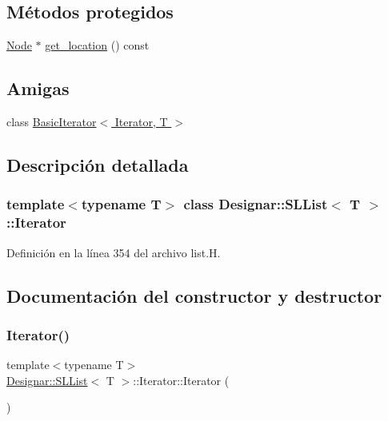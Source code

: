 \subsection*{Métodos protegidos}
\begin{DoxyCompactItemize}
\item 
\hyperlink{class_designar_1_1_node_s_l_list_a41963019ada1025099e3259207a3de96}{Node} $\ast$ \hyperlink{class_designar_1_1_s_l_list_1_1_iterator_af994c3d4b1f178e55d8b68d3b7a515cf}{get\+\_\+location} () const
\end{DoxyCompactItemize}
\subsection*{Amigas}
\begin{DoxyCompactItemize}
\item 
class \hyperlink{class_designar_1_1_s_l_list_1_1_iterator_ae3421d6be56b523bf3c41ceb29f3e5d7}{Basic\+Iterator$<$ Iterator, T $>$}
\end{DoxyCompactItemize}


\subsection{Descripción detallada}
\subsubsection*{template$<$typename T$>$\newline
class Designar\+::\+S\+L\+List$<$ T $>$\+::\+Iterator}



Definición en la línea 354 del archivo list.\+H.



\subsection{Documentación del constructor y destructor}
\mbox{\label{class_designar_1_1_s_l_list_1_1_iterator_a8c1c1f8110e22d81401e404c53003156}} 
\subsubsection{\texorpdfstring{Iterator()}{Iterator()}\hspace{0.1cm}{\footnotesize\ttfamily [1/5]}}
{\footnotesize\ttfamily template$<$typename T$>$ \\
\hyperlink{class_designar_1_1_s_l_list}{Designar\+::\+S\+L\+List}$<$ T $>$\+::Iterator\+::\+Iterator (\begin{DoxyParamCaption}{ }\end{DoxyParamCaption})\hspace{0.3cm}{\ttfamily [inline]}}



